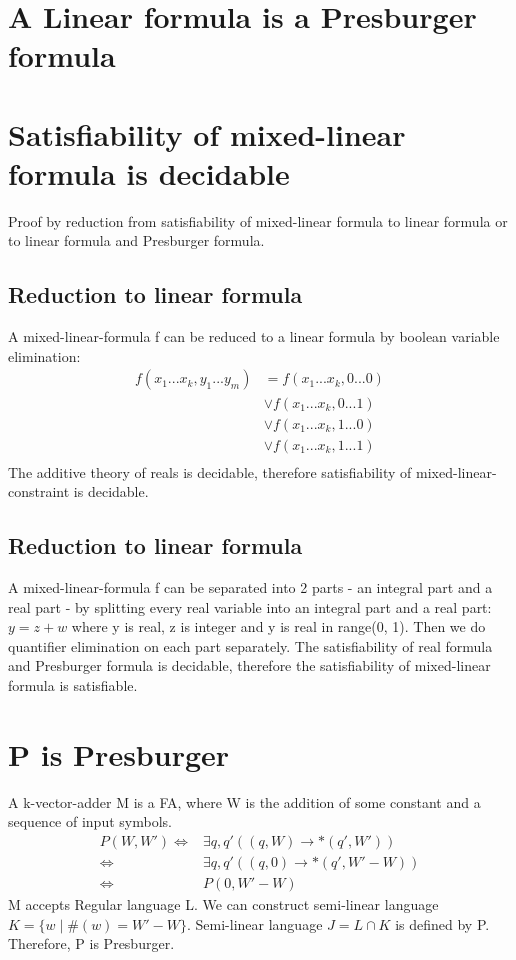 \documentclass{article}
\begin{document}
\section{A Linear formula is a Presburger formula}

\section{Satisfiability of mixed-linear formula is decidable}

Proof by reduction from satisfiability of mixed-linear formula to linear 
formula or to linear formula and Presburger formula.

\subsection{Reduction to linear formula}
A mixed-linear-formula f can be reduced to a linear formula by boolean variable 
elimination:
\begin{align*}
	f(x_1 ... x_k, y_1 ... y_m)
	&= f(x_1 ... x_k, 0 ... 0)\\
	&\lor f(x_1 ... x_k, 0 ... 1)\\
	&\lor f(x_1 ... x_k, 1 ... 0)\\
	&\lor f(x_1 ... x_k, 1 ... 1)\\
\end{align*}
The additive theory of reals is decidable, therefore satisfiability of 
mixed-linear-constraint is decidable.

\subsection{Reduction to linear formula}
A mixed-linear-formula f can be separated into 2 parts - an integral part and a 
real part - by splitting every real variable into an integral part and a real 
part: $ y = z + w $ where y is real, z is integer and y is real in range(0, 1). 
Then we do quantifier elimination on each part separately. The satisfiability 
of real formula and Presburger formula is decidable, therefore the 
satisfiability of mixed-linear formula is satisfiable.

\section{P is Presburger}
A k-vector-adder M is a FA, where W is the addition of some constant and a 
sequence of input symbols.
\begin{align*}
	P(W, W')
	\iff& \exists q, q' ((q, W) \rightarrow* (q', W'))\\
	\iff& \exists q, q' ((q, 0) \rightarrow* (q', W'-W))\\
	\iff& P(0, W' - W)
\end{align*}
M accepts Regular language L. We can construct semi-linear language $ K = \{w 
\mid \#(w) = W'-W\} $. Semi-linear language $ J = L \cap K $ is defined by P. 
Therefore, P is Presburger.
\end{document}
